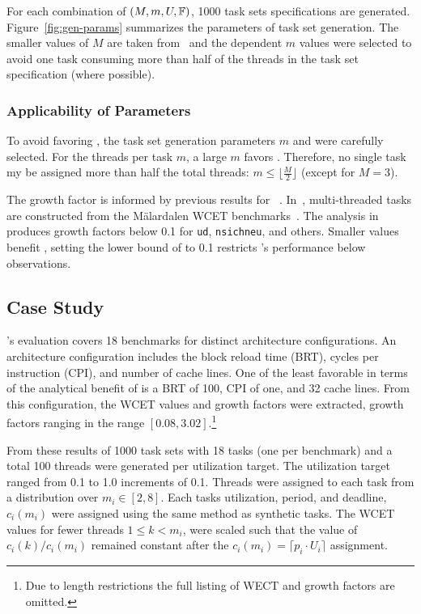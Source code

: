 For each combination of ${(M, m, U, \mathbb{F}{})}$, 1000 task sets
specifications are generated. Figure~\ref{fig:gen-params} summarizes
the parameters of task set generation. The smaller values of ${M}$ are taken
from~\cite{Bertogna:2010} and the dependent ${m}$ values were selected
to avoid one task consuming more than half of the threads in the
task set specification (where possible). 

\subsubsection{Applicability of Parameters}

To avoid favoring \tpj{}, the task set generation parameters ${m}$ and
\GFactor{} were carefully selected. For the threads per task ${m}$, a
large ${m}$ favors \tpj{}. Therefore, no single task my be
assigned more than half the total threads: ${m \le \lfloor \frac{M}{2}
\rfloor}$ (except for ${M = 3}$). 

The growth factor \GFactor{} is informed by previous results for
\bundlep{}~\cite{Tessler:2018b}. In~\cite{Tessler:2018b},
multi-threaded tasks are constructed from the M{\"a}lardalen WCET
benchmarks~\cite{Gustafsson:2010}. The analysis
in~\cite{Tessler:2018b} produces growth factors below 0.1 for
\texttt{ud}, \texttt{nsichneu}, and others. Smaller \GFactor{} values
benefit \tpj{}, setting the lower bound of \GFactor{} to 0.1 restricts
\tpj{}'s performance below observations.

\subsection{Case Study}

\bundlep{}'s evaluation covers 18 benchmarks for distinct architecture
configurations. An architecture configuration includes the block
reload time (BRT), cycles per instruction (CPI), and number of cache
lines. One of the least favorable in terms of the analytical
benefit of \bundlep{} is a BRT of 100, CPI of one, and 32 cache
lines. From this configuration, the WCET values and growth factors
were extracted, growth factors ranging in the range
${[0.08,3.02]}$.\footnote{Due to length restrictions the full listing
  of WECT and growth factors are omitted.}

From these results of \bundlep{} 1000 task sets with 18 tasks (one per
benchmark) and a total 100 threads were generated per utilization
target. The utilization target ranged from 0.1 to 1.0 increments of
0.1. Threads were assigned to each task  from a distribution
over ${m_i \in [2,8]}$. Each tasks utilization, period, and deadline,
${c_i(m_i)}$ were assigned using the same method as synthetic tasks.
The WCET values for fewer threads ${1 \le k < m_i}$, were scaled such
that the value of ${c_i(k) / c_i(m_i)}$ remained constant after the
${c_i(m_i) = \lceil p_i \cdot U_i \rceil}$ assignment.


